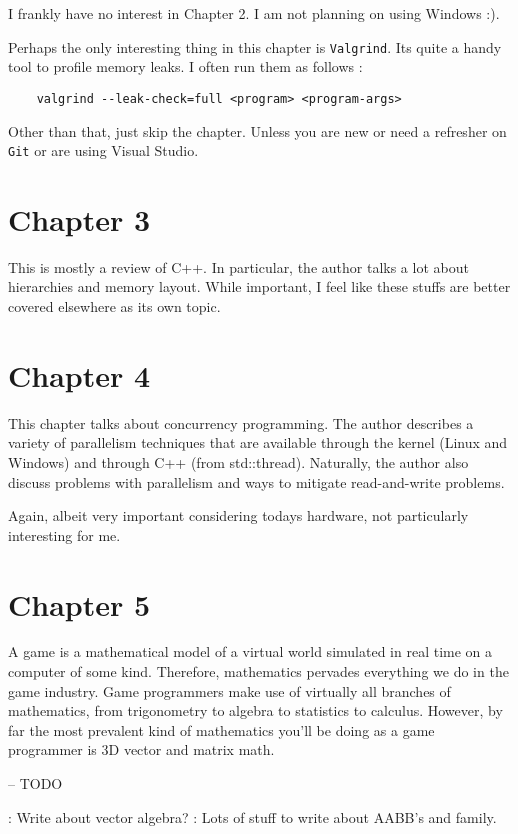 \documentclass[a4paper,12pt]{book}
\begin{document}
I frankly have no interest in Chapter 2.
I am not planning on using Windows :).

Perhaps the only interesting thing in this chapter is \texttt{Valgrind}.
Its quite a handy tool to profile memory leaks.
I often run them as follows :

\begin{lstlisting}
    valgrind --leak-check=full <program> <program-args>
\end{lstlisting}

Other than that, just skip the chapter.
Unless you are new or need a refresher on \texttt{Git} or are using Visual Studio.

\section{Chapter 3}

This is mostly a review of C++.
In particular, the author talks a lot about hierarchies and memory layout.
While important, I feel like these stuffs are better covered elsewhere as its own topic.

\section{Chapter 4}

This chapter talks about concurrency programming.
The author describes a variety of parallelism techniques that are available through the kernel (Linux and Windows) and through C++ (from std::thread).
Naturally, the author also discuss problems with parallelism and ways to mitigate read-and-write problems.

Again, albeit very important considering todays hardware, not particularly interesting for me.

\section{Chapter 5}

A game is a mathematical model of a virtual world simulated in real time on a computer of some kind.
Therefore, mathematics pervades everything we do in the game industry.
Game programmers make use of virtually all branches of mathematics, from trigonometry to algebra to statistics to calculus.
However, by far the most prevalent kind of mathematics you'll be doing as a game programmer is 3D vector and matrix math.

-- TODO

: Write about vector algebra?
: Lots of stuff to write about AABB's and family.
\end{document}
